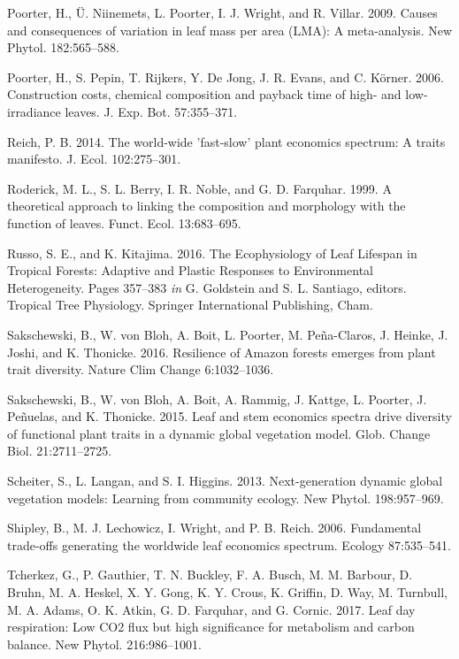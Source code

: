\documentclass[
  12pt,
]{article}
\newlength{\cslhangindent}
\newenvironment{cslreferences}%
  {\setlength{\parindent}{0pt}%
  \everypar{\setlength{\hangindent}{\cslhangindent}}\ignorespaces}%
  {\par}
\begin{document}
\begin{cslreferences}
\leavevmode\hypertarget{ref-Poorter2009}{}%
Poorter, H., Ü. Niinemets, L. Poorter, I. J. Wright, and R. Villar. 2009. Causes and consequences of variation in leaf mass per area (LMA): A meta-analysis. New Phytol. 182:565--588.

\leavevmode\hypertarget{ref-Poorter2006b}{}%
Poorter, H., S. Pepin, T. Rijkers, Y. De Jong, J. R. Evans, and C. Körner. 2006. Construction costs, chemical composition and payback time of high- and low-irradiance leaves. J. Exp. Bot. 57:355--371.

\leavevmode\hypertarget{ref-Reich2014}{}%
Reich, P. B. 2014. The world-wide 'fast-slow' plant economics spectrum: A traits manifesto. J. Ecol. 102:275--301.

\leavevmode\hypertarget{ref-Roderick1999}{}%
Roderick, M. L., S. L. Berry, I. R. Noble, and G. D. Farquhar. 1999. A theoretical approach to linking the composition and morphology with the function of leaves. Funct. Ecol. 13:683--695.

\leavevmode\hypertarget{ref-Russo2016}{}%
Russo, S. E., and K. Kitajima. 2016. The Ecophysiology of Leaf Lifespan in Tropical Forests: Adaptive and Plastic Responses to Environmental Heterogeneity. Pages 357--383 \emph{in} G. Goldstein and S. L. Santiago, editors. Tropical Tree Physiology. Springer International Publishing, Cham.

\leavevmode\hypertarget{ref-Sakschewski2016}{}%
Sakschewski, B., W. von Bloh, A. Boit, L. Poorter, M. Peña-Claros, J. Heinke, J. Joshi, and K. Thonicke. 2016. Resilience of Amazon forests emerges from plant trait diversity. Nature Clim Change 6:1032--1036.

\leavevmode\hypertarget{ref-Sakschewski2015}{}%
Sakschewski, B., W. von Bloh, A. Boit, A. Rammig, J. Kattge, L. Poorter, J. Peñuelas, and K. Thonicke. 2015. Leaf and stem economics spectra drive diversity of functional plant traits in a dynamic global vegetation model. Glob. Change Biol. 21:2711--2725.

\leavevmode\hypertarget{ref-Scheiter2013}{}%
Scheiter, S., L. Langan, and S. I. Higgins. 2013. Next-generation dynamic global vegetation models: Learning from community ecology. New Phytol. 198:957--969.

\leavevmode\hypertarget{ref-Shipley2006}{}%
Shipley, B., M. J. Lechowicz, I. Wright, and P. B. Reich. 2006. Fundamental trade-offs generating the worldwide leaf economics spectrum. Ecology 87:535--541.

\leavevmode\hypertarget{ref-Tcherkez2017}{}%
Tcherkez, G., P. Gauthier, T. N. Buckley, F. A. Busch, M. M. Barbour, D. Bruhn, M. A. Heskel, X. Y. Gong, K. Y. Crous, K. Griffin, D. Way, M. Turnbull, M. A. Adams, O. K. Atkin, G. D. Farquhar, and G. Cornic. 2017. Leaf day respiration: Low CO2 flux but high significance for metabolism and carbon balance. New Phytol. 216:986--1001.


\end{cslreferences}
\end{document}
